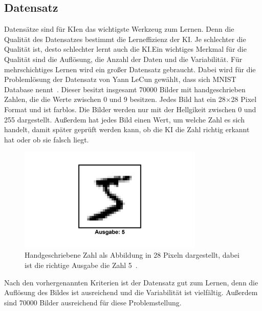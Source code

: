 \documentclass[11pt]{article}
\begin{document}
\subsection{Datensatz}
Datensätze sind für KIen das wichtigste Werkzeug zum Lernen. Denn die Qualität des Datensatzes bestimmt die Lerneffizienz der KI.\@
Je schlechter die Qualität ist, desto schlechter lernt auch die KI.\@ Ein wichtiges Merkmal für die Qualität sind die Auflösung, die Anzahl der Daten und die Variabilität.
Für mehrschichtiges Lernen wird ein großer Datensatz gebraucht. Dabei wird für die Problemlösung der Datensatz von Yann LeCun gewählt, dass sich MNIST Database nennt~\cite{3}.
Dieser besitzt insgesamt 70000 Bilder mit handgeschrieben Zahlen, die die Werte zwischen 0 und 9 besitzen. Jedes Bild hat ein 28$\times$28 Pixel
Format und ist farblos. Die Bilder werden nur mit der Hellgikeit zwischen 0 und 255 dargestellt. Außerdem hat jedes Bild einen Wert, um welche Zahl
es sich handelt, damit später geprüft werden kann, ob die KI die Zahl richtig erkannt hat oder ob sie falsch liegt.
\begin{figure}[h]
    \centering
    \includegraphics[width=250pt, keepaspectratio]{images/number}
    \caption[Handgeschriebene Zahl 5~\cite{3}]{Handgeschriebene Zahl als Abbildung in 28 Pixeln dargestellt, dabei ist die richtige Ausgabe die Zahl 5~\cite{3}.}
\end{figure}
Nach den vorhergenannten Kriterien ist der Datensatz gut zum Lernen, denn die Auflösung des Bildes ist ausreichend und die Variabilität ist vielfältig.
Außerdem sind 70000 Bilder ausreichend für diese Problemstellung.
\end{document}
